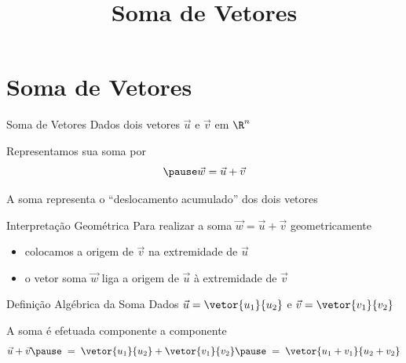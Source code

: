 \documentclass[fleqn,aspectratio=169,12pt]{beamer}
\title{Soma de Vetores}
\begin{document}
\addtitle

\section{Soma de Vetores}

\begin{frame}{Soma de Vetores}
  Dados dois vetores
  \(
    \vec{u}
  \)
  e
  \(
    \vec{v}
  \)
  em \(\R^n\)

  \pause
  Representamos sua soma por
  \[
    \pause
    \vec{w} = \vec{u} + \vec{v}
  \]

  \pause
  A soma representa o ``deslocamento acumulado'' dos dois vetores
\end{frame}

\begin{frame}{Interpretação Geométrica}
  Para realizar a soma
  \(
    \vec{w} = \vec{u} + \vec{v}
  \)
  geometricamente
  \pause
  \begin{itemize}
      \item colocamos a origem de $\vec{v}$ na extremidade de $\vec{u}$
      \pause
      \item o vetor soma \(\vec{w}\) liga a origem de $\vec{u}$ à extremidade de $\vec{v}$
  \end{itemize}
\end{frame}


\begin{frame}{Definição Algébrica da Soma}
  Dados
  \(
    \vec{u} = \vetor{u_1}{u_2}
  \)
  e
  \(
    \vec{v} = \vetor{v_1}{v_2}
  \)

  \pause
  \medskip
  A soma é efetuada componente a componente
  \pause
  \[
    \vec{u}+\vec{v}
    \pause
    \;=\; \vetor{u_1}{u_2} + \vetor{v_1}{v_2}
    \pause
    \;=\; \vetor{u_1+v_1}{u_2+v_2}
  \]
\end{frame}


\end{document}
